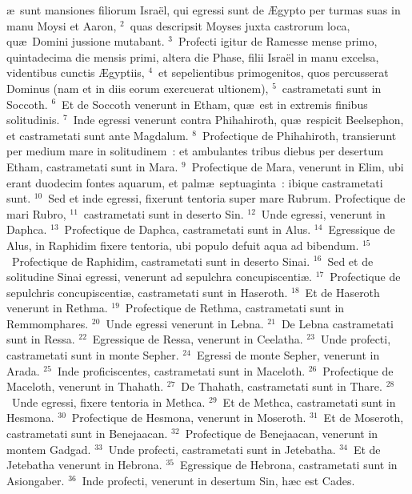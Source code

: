\bchapter
{}\ae\ sunt mansiones filiorum Isra\"el, qui egressi sunt de \AE gypto per turmas suas in manu Moysi et Aaron,
${}^{2}$~quas descripsit Moyses juxta castrorum loca, qu\ae\ Domini jussione mutabant.
${}^{3}$~Profecti igitur de Ramesse mense primo, quintadecima die mensis primi, altera die Phase, filii Isra\"el in manu excelsa, videntibus cunctis \AE gyptiis,
${}^{4}$~et sepelientibus primogenitos, quos percusserat Dominus (nam et in diis eorum exercuerat ultionem),
${}^{5}$~castrametati sunt in Soccoth.
${}^{6}$~Et de Soccoth venerunt in Etham, qu\ae\ est in extremis finibus solitudinis.
${}^{7}$~Inde egressi venerunt contra Phihahiroth, qu\ae\ respicit Beelsephon, et castrametati sunt ante Magdalum.
${}^{8}$~Profectique de Phihahiroth, transierunt per medium mare in solitudinem~: et ambulantes tribus diebus per desertum Etham, castrametati sunt in Mara.
${}^{9}$~Profectique de Mara, venerunt in Elim, ubi erant duodecim fontes aquarum, et palm\ae\ septuaginta~: ibique castrametati sunt.
${}^{10}$~Sed et inde egressi, fixerunt tentoria super mare Rubrum. Profectique de mari Rubro,
${}^{11}$~castrametati sunt in deserto Sin.
${}^{12}$~Unde egressi, venerunt in Daphca.
${}^{13}$~Profectique de Daphca, castrametati sunt in Alus.
${}^{14}$~Egressique de Alus, in Raphidim fixere tentoria, ubi populo defuit aqua ad bibendum.
${}^{15}$~Profectique de Raphidim, castrametati sunt in deserto Sinai.
${}^{16}$~Sed et de solitudine Sinai egressi, venerunt ad sepulchra concupiscenti\ae .
${}^{17}$~Profectique de sepulchris concupiscenti\ae , castrametati sunt in Haseroth.
${}^{18}$~Et de Haseroth venerunt in Rethma.
${}^{19}$~Profectique de Rethma, castrametati sunt in Remmomphares.
${}^{20}$~Unde egressi venerunt in Lebna.
${}^{21}$~De Lebna castrametati sunt in Ressa.
${}^{22}$~Egressique de Ressa, venerunt in Ceelatha.
${}^{23}$~Unde profecti, castrametati sunt in monte Sepher.
${}^{24}$~Egressi de monte Sepher, venerunt in Arada.
${}^{25}$~Inde proficiscentes, castrametati sunt in Maceloth.
${}^{26}$~Profectique de Maceloth, venerunt in Thahath.
${}^{27}$~De Thahath, castrametati sunt in Thare.
${}^{28}$~Unde egressi, fixere tentoria in Methca.
${}^{29}$~Et de Methca, castrametati sunt in Hesmona.
${}^{30}$~Profectique de Hesmona, venerunt in Moseroth.
${}^{31}$~Et de Moseroth, castrametati sunt in Benejaacan.
${}^{32}$~Profectique de Benejaacan, venerunt in montem Gadgad.
${}^{33}$~Unde profecti, castrametati sunt in Jetebatha.
${}^{34}$~Et de Jetebatha venerunt in Hebrona.
${}^{35}$~Egressique de Hebrona, castrametati sunt in Asiongaber.
${}^{36}$~Inde profecti, venerunt in desertum Sin, h\ae c est Cades.
